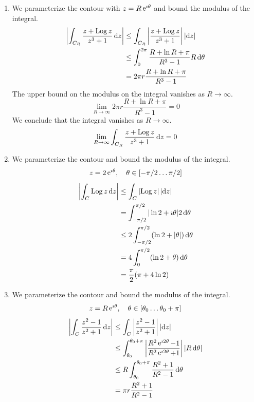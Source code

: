 {\begin{Solution}
  \label{solution bound z Log z z3+1}
  \begin{enumerate}
  \item 
    We parameterize the contour with $z = R \mathop{\mathrm{e}}\nolimits^{\imath \theta}$ and bound the 
    modulus of the integral.
    \begin{align*}
      \left| \int_{C_R} \frac{ z + \mathop{\mathrm{Log}}\nolimits z }{ z^3 + 1 } \,\mathrm{d} z \right|
      &\leq \int_{C_R} \left| \frac{ z + \mathop{\mathrm{Log}}\nolimits z }{ z^3 + 1 } \right|  
      \left| \mathrm{d} z \right|
      \\
      &\leq \int_0^{2 \pi} \frac{ R + \ln R + \pi }{ R^3 - 1 }  R \,\mathrm{d} \theta
      \\
      &= 2 \pi r \frac{ R + \ln R + \pi }{ R^3 - 1 }
    \end{align*}
    The upper bound on the modulus on the integral vanishes as $R \to \infty$.
    \[
    \lim_{R \to \infty}  2 \pi r \frac{ R + \ln R + \pi }{ R^3 - 1 } = 0
    \]
    We conclude that the integral vanishes as $R \to \infty$.
    \[
    \lim_{R \to \infty} \int_{C_R} \frac{ z + \mathop{\mathrm{Log}}\nolimits z }{ z^3 + 1 } \,\mathrm{d} z = 0
    \]
  \item 
    We parameterize the contour and bound the modulus of the integral.
    \[
    z = 2 \mathop{\mathrm{e}}\nolimits^{\imath \theta}, \quad \theta \in [-\pi/2 \ldots \pi/2]
    \]
    \begin{align*}
      \left| \int_C \mathop{\mathrm{Log}}\nolimits z \,\mathrm{d} z \right|
      &\leq \int_C \left| \mathop{\mathrm{Log}}\nolimits z \right| \left| \mathrm{d} z \right|
      \\
      &= \int_{-\pi/2}^{\pi/2} |\ln 2 + \imath \theta| 2\,\mathrm{d} \theta
      \\
      &\leq 2 \int_{-\pi/2}^{\pi/2} (\ln 2 + |\theta|)\,\mathrm{d} \theta
      \\
      &= 4 \int_0^{\pi/2} (\ln 2 + \theta)\,\mathrm{d} \theta
      \\
      &= \frac{\pi}{2} (\pi + 4 \ln 2)
    \end{align*}
  \item 
    We parameterize the contour and bound the modulus of the integral.
    \[
    z = R \mathop{\mathrm{e}}\nolimits^{\imath \theta}, \quad \theta \in [\theta_0 \ldots \theta_0 + \pi]
    \]
    \begin{align*}
      \left| \int_C \frac{ z^2 - 1 }{ z^2 + 1 } \,\mathrm{d} z \right| 
      &\leq \int_C \left| \frac{ z^2 - 1 }{ z^2 + 1 } \right|  \left| \mathrm{d} z \right| 
      \\
      &\leq \int_{\theta_0}^{\theta_0 + \pi} \left| \frac{ R^2 \mathop{\mathrm{e}}\nolimits^{\imath 2 \theta} - 1 }{ R^2 \mathop{\mathrm{e}}\nolimits^{\imath 2 \theta} + 1 } \right| 
      \left| R\,\mathrm{d} \theta \right| 
      \\
      &\leq R \int_{\theta_0}^{\theta_0 + \pi} \frac{ R^2 + 1 }{ R^2 - 1 }\,\mathrm{d} \theta 
      \\
      &= \pi r \frac{R^2 + 1}{R^2 - 1}
    \end{align*}
  \end{enumerate}  
\end{Solution}







}
